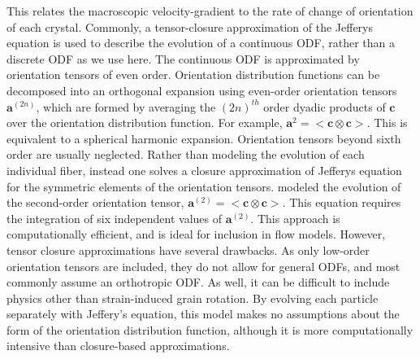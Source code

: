 \documentclass{igs}
\begin{document}
This relates the macroscopic velocity-gradient to the rate of change of orientation of each crystal. Commonly, a tensor-closure approximation of the Jefferys equation\citep{advani1987} is used to describe the evolution of a continuous ODF, rather than a discrete ODF as we use here. The continuous ODF is approximated by orientation tensors of even order. Orientation distribution functions can be decomposed into an orthogonal expansion using even-order orientation tensors $\boldsymbol{a}^{(2n)}$, which are formed by averaging the $(2n)^{th}$ order dyadic products of $\boldsymbol{c}$ over the orientation distribution function. For example, $\boldsymbol{a}^{2}=<\boldsymbol{c} \otimes \boldsymbol{c}>$. This is equivalent to a spherical harmonic expansion. Orientation tensors beyond sixth order are usually neglected. Rather than modeling the evolution of each individual fiber, instead one solves a closure approximation of Jefferys equation for the symmetric elements of the orientation tensors.  \citet{gillet2005} modeled the evolution of the second-order orientation tensor, $\boldsymbol{a}^{(2)} = <\boldsymbol{c} \otimes \boldsymbol{c}>$. This equation requires the integration of six independent values of $\boldsymbol{a}^{(2)}$. This approach is computationally efficient, and is ideal for inclusion in flow models. However, tensor closure approximations have several drawbacks. As only low-order orientation tensors are included, they do not allow for general ODFs, and most commonly assume an orthotropic ODF. As well, it can be difficult to include physics other than strain-induced grain rotation. By evolving each particle separately with Jeffery's equation, this model makes no assumptions about the form of the orientation distribution function, although it is more computationally intensive than closure-based approximations.

\end{document}
